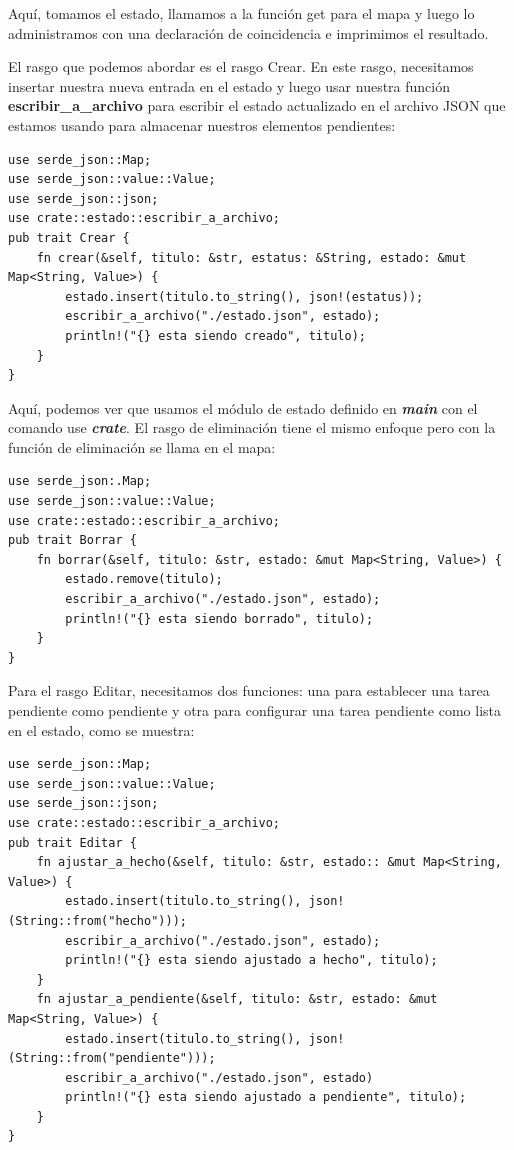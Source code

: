 Aquí, tomamos el estado, llamamos a la función get para el mapa y luego lo administramos con una declaración de coincidencia e imprimimos el resultado.

El rasgo que podemos abordar es el rasgo Crear. En este rasgo, necesitamos insertar nuestra nueva entrada en el estado y luego usar nuestra función \textbf{escribir\_a\_archivo} para escribir el estado actualizado en el archivo JSON que estamos usando para almacenar nuestros elementos pendientes:

\begin{lstlisting}
use serde_json::Map;
use serde_json::value::Value;
use serde_json::json;
use crate::estado::escribir_a_archivo;
pub trait Crear {
	fn crear(&self, titulo: &str, estatus: &String, estado: &mut Map<String, Value>) {
		estado.insert(titulo.to_string(), json!(estatus));
		escribir_a_archivo("./estado.json", estado);
		println!("{} esta siendo creado", titulo);
	}
}	
\end{lstlisting}

Aquí, podemos ver que usamos el módulo de estado definido en \textbf{\textit{main}} con el comando use \textbf{\textit{crate}}. El rasgo de eliminación tiene el mismo enfoque pero con la función de eliminación se llama en el mapa:

\begin{lstlisting}
use serde_json:.Map;
use serde_json::value::Value;
use crate::estado::escribir_a_archivo;
pub trait Borrar {
	fn borrar(&self, titulo: &str, estado: &mut Map<String, Value>) {
		estado.remove(titulo);
		escribir_a_archivo("./estado.json", estado);
		println!("{} esta siendo borrado", titulo);
	}
}
\end{lstlisting}

Para el rasgo Editar, necesitamos dos funciones: una para establecer una tarea pendiente como pendiente y otra para configurar una tarea pendiente como lista en el estado, como se muestra:

\begin{lstlisting}
use serde_json::Map;
use serde_json::value::Value;
use serde_json::json;
use crate::estado::escribir_a_archivo;
pub trait Editar {
	fn ajustar_a_hecho(&self, titulo: &str, estado:: &mut Map<String, Value>) {
		estado.insert(titulo.to_string(), json!(String::from("hecho")));
		escribir_a_archivo("./estado.json", estado);
		println!("{} esta siendo ajustado a hecho", titulo);
	}
	fn ajustar_a_pendiente(&self, titulo: &str, estado: &mut Map<String, Value>) {
		estado.insert(titulo.to_string(), json!(String::from("pendiente")));
		escribir_a_archivo("./estado.json", estado)
		println!("{} esta siendo ajustado a pendiente", titulo);
	}
}
\end{lstlisting}

